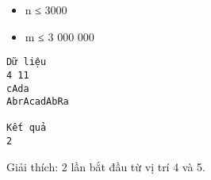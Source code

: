 \begin{itemize}
	\item     n ≤ 3000   
	\item     m ≤ 3 000 000   
\end{itemize}
\begin{verbatim}
Dữ liệu
4 11
cAda
AbrAcadAbRa

Kết quả
2
\end{verbatim}

       Giải thích:      2 lần bắt đầu từ vị trí 4 và 5.